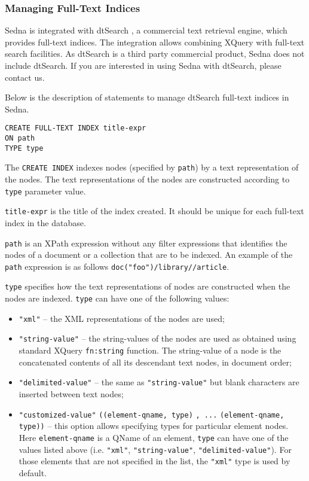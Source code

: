 \documentclass[a4paper,12pt]{article}
\begin{document}
\subsubsection{Managing Full-Text Indices}
\label{sec:managing-ft-indices}
Sedna is integrated with dtSearch \cite{link:dtsearch-engine}, a commercial text
retrieval engine, which provides full-text indices. The integration allows
combining XQuery with full-text search facilities. As dtSearch is a third party
commercial product, Sedna does not include dtSearch. If you are interested in
using Sedna with dtSearch, please contact us.

Below is the description of statements to manage dtSearch full-text indices in
Sedna.

\begin{verbatim}
CREATE FULL-TEXT INDEX title-expr
ON path
TYPE type
\end{verbatim}

The \verb!CREATE INDEX! indexes nodes (specified by \verb!path!) by a text
representation of the nodes. The text representations of the nodes are
constructed according to \verb!type! parameter value.

\verb!title-expr! is the title of the index created. It should be unique for
each full-text index in the database.

\verb!path! is an XPath expression without any filter expressions that
identifies the nodes of a document or a collection that are to be indexed. An
example of the \verb!path! expression is as follows
\verb!doc("foo")/library//article!.

\verb!type! specifies how the text representations of nodes are constructed when
the nodes are indexed. \verb!type! can have one of the following values:

\begin{itemize}
\item \verb!"xml"! -- the XML representations of the nodes are used;
\item \verb!"string-value"! -- the string-values of the nodes are used as
obtained using standard XQuery \verb!fn:string! function. The string-value of a
node is the concatenated contents of all its descendant text nodes, in document
order;
\item \verb!"delimited-value"! -- the same as \verb!"string-value"! but blank
characters are inserted between text nodes;
\item \verb!"customized-value"! \verb!((element-qname, type)! \verb!, ...!
\verb!(element-qname, type))! -- this option allows specifying types for
particular element nodes. Here \verb!element-qname! is a QName of an element,
\verb!type! can have one of the values listed above (i.e. \verb!"xml"!,
\verb!"string-value"!, \verb!"delimited-value"!). For those elements that are
not specified in the list, the \verb!"xml"! type is used by default.
\end{itemize}
\end{document}
